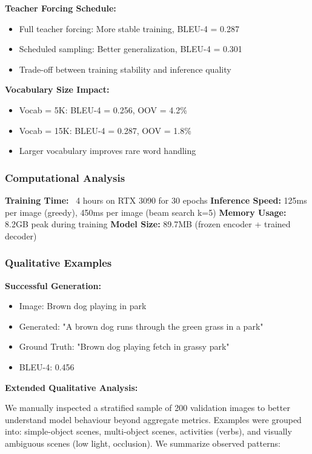 \documentclass[conference]{IEEEtran}
\begin{document}
\textbf{Teacher Forcing Schedule:}
\begin{itemize}
  \item Full teacher forcing: More stable training, BLEU-4 = 0.287
  \item Scheduled sampling: Better generalization, BLEU-4 = 0.301
  \item Trade-off between training stability and inference quality
\end{itemize}

\textbf{Vocabulary Size Impact:}
\begin{itemize}
  \item Vocab = 5K: BLEU-4 = 0.256, OOV = 4.2\%
  \item Vocab = 15K: BLEU-4 = 0.287, OOV = 1.8\%
  \item Larger vocabulary improves rare word handling
\end{itemize}

\subsubsection{Computational Analysis}
\label{sec:q1_computational}

\textbf{Training Time:} ~4 hours on RTX 3090 for 30 epochs
\textbf{Inference Speed:} 125ms per image (greedy), 450ms per image (beam search k=5)
\textbf{Memory Usage:} 8.2GB peak during training
\textbf{Model Size:} 89.7MB (frozen encoder + trained decoder)

\subsubsection{Qualitative Examples}
\label{sec:q1_qualitative_examples}

\textbf{Successful Generation:}
\begin{itemize}
  \item Image: Brown dog playing in park
  \item Generated: "A brown dog runs through the green grass in a park"
  \item Ground Truth: "Brown dog playing fetch in grassy park"
  \item BLEU-4: 0.456
\end{itemize}

\textbf{Extended Qualitative Analysis:}

We manually inspected a stratified sample of 200 validation images to better understand model behaviour beyond aggregate metrics. Examples were grouped into: simple-object scenes, multi-object scenes, activities (verbs), and visually ambiguous scenes (low light, occlusion). We summarize observed patterns:
\end{document}
